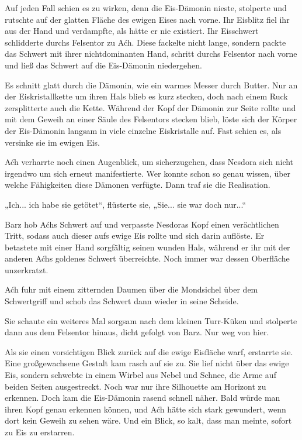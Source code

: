 Auf jeden Fall schien es zu wirken, denn die Eis-Dämonin nieste, stolperte und rutschte auf der glatten Fläche des ewigen Eises nach vorne. Ihr Eisblitz fiel ihr aus der Hand und verdampfte, als hätte er nie existiert. Ihr Eisschwert schlidderte durchs Felsentor zu Aćh. Diese fackelte nicht lange, sondern packte das Schwert mit ihrer nichtdominanten Hand, schritt durchs Felsentor nach vorne und ließ das Schwert auf die Eis-Dämonin niedergehen.

Es schnitt glatt durch die Dämonin, wie ein warmes Messer durch Butter. Nur an der Eiskristallkette um ihren Hals blieb es kurz stecken, doch nach einem Ruck zersplitterte auch die Kette. Während der Kopf der Dämonin zur Seite rollte und mit dem Geweih an einer Säule des Felsentors stecken blieb, löste sich der Körper der Eis-Dämonin langsam in viele einzelne Eiskristalle auf. Fast schien es, als versinke sie im ewigen Eis.

Aćh verharrte noch einen Augenblick, um sicherzugehen, dass Nesdora sich nicht irgendwo um sich erneut manifestierte. Wer konnte schon so genau wissen, über welche Fähigkeiten diese Dämonen verfügte. Dann traf sie die Realisation.

„Ich... ich habe sie getötet“, flüsterte sie, „Sie... sie war doch nur...“

Barz hob Aćhs Schwert auf und verpasste Nesdoras Kopf einen verächtlichen Tritt, sodass auch dieser aufs ewige Eis rollte und sich darin auflöste. Er betastete mit einer Hand sorgfältig seinen wunden Hals, während er ihr mit der anderen Aćhs goldenes Schwert überreichte. Noch immer war dessen Oberfläche unzerkratzt.

Aćh fuhr mit einem zitternden Daumen über die Mondsichel über dem Schwertgriff und schob das Schwert dann wieder in seine Scheide.

Sie schaute ein weiteres Mal sorgsam nach dem kleinen Turr-Küken und stolperte dann aus dem Felsentor hinaus, dicht gefolgt von Barz. Nur weg von hier.

Als sie einen vorsichtigen Blick zurück auf die ewige Eisfläche warf, erstarrte sie. Eine großgewachsene Gestalt kam rasch auf sie zu. Sie lief nicht über das ewige Eis, sondern schwebte in einem Wirbel aus Nebel und Schnee, die Arme auf beiden Seiten ausgestreckt. Noch war nur ihre Silhouette am Horizont zu erkennen. Doch kam die Eis-Dämonin rasend schnell näher. Bald würde man ihren Kopf genau erkennen können, und Aćh hätte sich stark gewundert, wenn dort kein Geweih zu sehen wäre. Und ein Blick, so kalt, dass man meinte, sofort zu Eis zu erstarren.


